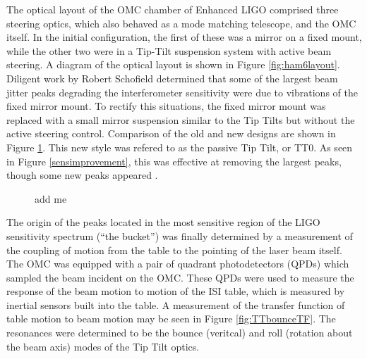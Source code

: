 The optical layout of the OMC chamber of Enhanced LIGO comprised three steering optics, which also behaved as a mode matching telescope, and the OMC itself. %
In the initial configuration, the first of these was a mirror on a fixed mount, while the other two were in a Tip-Tilt suspension system with active beam steering. %
A diagram of the optical layout is shown in Figure \ref{fig:ham6layout}. %
Diligent work by Robert Schofield determined that some of the largest beam jitter peaks degrading the interferometer sensitivity were due to vibrations of the fixed mirror mount. To rectify this situations, the fixed mirror mount was replaced with a small mirror suspension similar to the Tip Tilts but without the active steering control. %
Comparison of the old and new designs are shown in Figure \ref{fig:TT0photos}. %
This new style was refered to as the passive Tip Tilt, or TT0. %
As seen in Figure \ref{sensimprovement}, this was effective at removing the largest peaks, though some new peaks appeared .

\begin{figure}
  \begin{center}
  \leavevmode
  \end{center}
  \caption[add me]{add me}
  \label{fig:TT0photos}
\end{figure}

The origin of the peaks located in the most sensitive region of the LIGO sensitivity spectrum (``the bucket'') was finally determined by a measurement of the coupling of motion from the table to the pointing of the laser beam itself. %
The OMC was equipped with a pair of quadrant photodetectors (QPDs) which sampled the beam incident on the OMC. %
These QPDs were used to measure the response of the beam motion to motion of the ISI table, which is measured by inertial sensors built into the table. %
A measurement of the transfer function of table motion to beam motion may be seen in Figure \ref{fig:TTbounceTF}. %
The resonances were determined to be the bounce (veritcal) and roll (rotation about the beam axis) modes of the Tip Tilt optics. %

